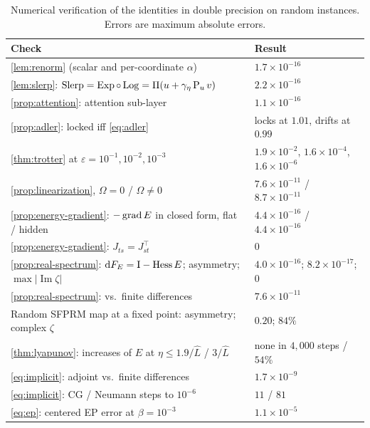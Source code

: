 \begin{table}[t]
  \caption{Numerical verification of the identities in double precision on random instances.
  Errors are maximum absolute errors.}
  \label{tab:numerics}
  \vskip 0.1in
  \begin{center}
  \begin{small}
  \begin{tabular}{@{}p{}p{}@{}}
    \toprule
    Check & Result \\
    \midrule
    \cref{lem:renorm} (scalar and per-coordinate $\alpha$) & $1.7\times10^{-16}$ \\
    \cref{lem:slerp}: $\operatorname{Slerp}=\operatorname{Exp}\circ\operatorname{Log}=\Pi(u+\gamma_\eta\operatorname{P}_uv)$ & $2.2\times10^{-16}$ \\
    \cref{prop:attention}: attention sub-layer & $1.1\times10^{-16}$ \\
    \cref{prop:adler}: locked iff \eqref{eq:adler} & locks at $1.01$, drifts at $0.99$ \\
    \cref{thm:trotter} at $\varepsilon=10^{-1},10^{-2},10^{-3}$ & $1.9\!\times\!10^{-2}$, $1.6\!\times\!10^{-4}$, $1.6\!\times\!10^{-6}$ \\
    \cref{prop:linearization}, $\Omega=0$ / $\Omega\neq0$ & $7.6\times10^{-11}$ / $8.7\times10^{-11}$ \\
    \midrule
    \cref{prop:energy-gradient}: $-\operatorname{grad} E$ in closed form, flat / hidden & $4.4\times10^{-16}$ / $4.4\times10^{-16}$ \\
    \cref{prop:energy-gradient}: $J_{ts}=J_{st}^\top$ & $0$ \\
    \cref{prop:real-spectrum}: $\mathrm dF_E=\mathrm{I}-\operatorname{Hess}E$; asymmetry; $\max|\operatorname{Im}\zeta|$ & $4.0\times10^{-16}$; $8.2\times10^{-17}$; $0$ \\
    \cref{prop:real-spectrum}: vs.\ finite differences & $7.6\times10^{-11}$ \\
    Random SFPRM map at a fixed point: asymmetry; complex $\zeta$ & $0.20$; $84\%$ \\
    \cref{thm:lyapunov}: increases of $E$ at $\eta\le1.9/\hat L$ / $3/\hat L$ & none in $4{,}000$ steps / $54\%$ \\
    \eqref{eq:implicit}: adjoint vs.\ finite differences & $1.7\times10^{-9}$ \\
    \eqref{eq:implicit}: CG / Neumann steps to $10^{-6}$ & $11$ / $81$ \\
    \eqref{eq:ep}: centered EP error at $\beta=10^{-3}$ & $1.1\times10^{-5}$ \\
    \bottomrule
  \end{tabular}
  \end{small}
  \end{center}
  \vskip -0.1in
\end{table}

